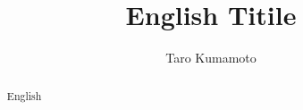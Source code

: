 


\Synopsis

\begin{Abstract}

\end{Abstract}

%
% 
\title{English Titile}
\author{Taro Kumamoto}

\synopsis

\begin{abstract}
English
\end{abstract}



















